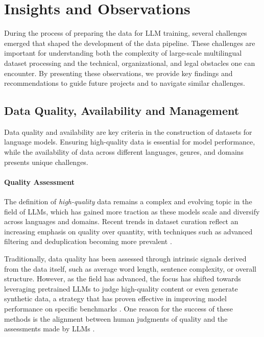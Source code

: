 \section{Insights and Observations}\label{sec:insights}

During the process of preparing the data for LLM training,
several challenges emerged that shaped the development of the data pipeline. 
These challenges are important for understanding both the complexity of 
large-scale multilingual dataset processing and the technical, 
organizational, and legal obstacles one can encounter. By presenting these 
observations, we provide key findings and recommendations to guide future 
projects and to navigate similar challenges.

\subsection{Data Quality, Availability and Management}
\label{sec:insights.data}
Data quality and availability are key criteria in the 
construction of datasets for language models. Ensuring high-quality 
data is essential for model performance, while the availability of 
data across different languages, genres, and domains presents unique challenges.

\paragraph{Quality Assessment}
The definition of \textsl{high-quality} data remains a complex and evolving 
topic in the field of LLMs, which has gained more traction as these models 
scale and diversify across languages and domains. Recent trends in dataset 
curation reflect an increasing emphasis on quality over quantity, with 
techniques such as advanced filtering and deduplication becoming more 
prevalent \cite{penedo_kydlicek_etal2024,wang_mrini_etal2024}.

Traditionally, data quality has been assessed through intrinsic signals 
derived from the data itself, such as average word length, sentence complexity, 
or overall structure. However, as the field has advanced, the focus has 
shifted towards leveraging pretrained LLMs to judge high-quality 
content or even generate synthetic data, a strategy that has proven 
effective in improving model performance on specific benchmarks \cite{gunasekar_zhang_etal2023,kumar_choudhary_etal2020,yoo_park_etal2021}. 
One reason for the success of these methods is the alignment between human 
judgments of quality and the assessments made by 
LLMs \cite{wang_liang_etal2023,kocmi_federmann2023,fu_ng_etal2023}.

